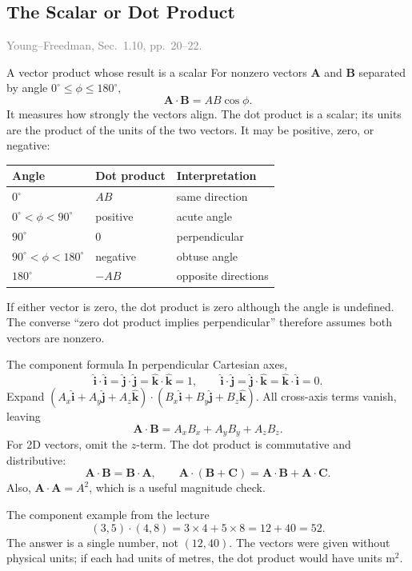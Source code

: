 \documentclass[11pt,letterpaper]{article}
\newcommand{\vect}[1]{\boldsymbol{#1}}
\newcommand{\uv}[1]{\hat{\boldsymbol{#1}}}
\newcommand{\degree}{^{\circ}}
\newcommand{\bookref}[2]{\textcolor{gray}{\footnotesize Young--Freedman, Sec.~#1, pp.~#2.}}
\begin{document}
\subsection{The Scalar or Dot Product}
\bookref{1.10}{20--22}

\begin{defbox}{A vector product whose result is a scalar}
For nonzero vectors $\vect A$ and $\vect B$ separated by angle $0\degree\leq\phi\leq180\degree$,
\[
 \boxed{\vect A\cdot\vect B=AB\cos\phi.}
\]
It measures how strongly the vectors align. The dot product is a scalar; its units are the product of the units of the two vectors. It may be positive, zero, or negative:
\begin{center}
\begin{tabular}{lll}
\toprule
Angle & Dot product & Interpretation\\
\midrule
$0\degree$ & $AB$ & same direction\\
$0\degree<\phi<90\degree$ & positive & acute angle\\
$90\degree$ & $0$ & perpendicular\\
$90\degree<\phi<180\degree$ & negative & obtuse angle\\
$180\degree$ & $-AB$ & opposite directions\\
\bottomrule
\end{tabular}
\end{center}
If either vector is zero, the dot product is zero although the angle is undefined. The converse ``zero dot product implies perpendicular'' therefore assumes both vectors are nonzero.
\end{defbox}

\begin{derivbox}{The component formula}
In perpendicular Cartesian axes,
\[
 \uv i\cdot\uv i=\uv j\cdot\uv j=\uv k\cdot\uv k=1,
 \qquad\uv i\cdot\uv j=\uv j\cdot\uv k=\uv k\cdot\uv i=0.
\]
Expand $(A_x\uv i+A_y\uv j+A_z\uv k)\cdot(B_x\uv i+B_y\uv j+B_z\uv k)$. All cross-axis terms vanish, leaving
\[
 \boxed{\vect A\cdot\vect B=A_xB_x+A_yB_y+A_zB_z.}
\]
For 2D vectors, omit the $z$-term. The dot product is commutative and distributive:
\[
 \vect A\cdot\vect B=\vect B\cdot\vect A,\qquad
 \vect A\cdot(\vect B+\vect C)=\vect A\cdot\vect B+\vect A\cdot\vect C.
\]
Also, $\vect A\cdot\vect A=A^2$, which is a useful magnitude check.
\end{derivbox}

\begin{examplebox}{The component example from the lecture}
\[
 (3,5)\cdot(4,8)=3\times4+5\times8=12+40=\boxed{52}.
\]
The answer is a single number, not $(12,40)$. The vectors were given without physical units; if each had units of metres, the dot product would have units $\mathrm{m^2}$.
\end{examplebox}
\end{document}
